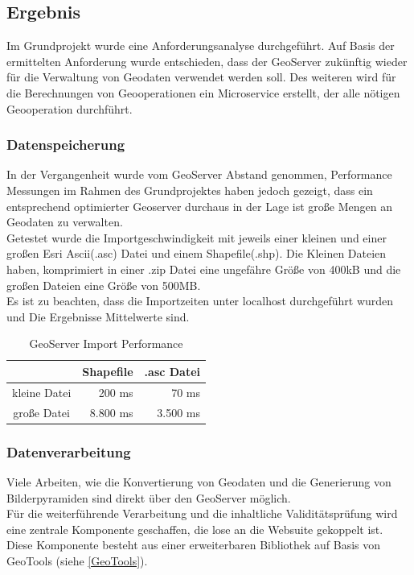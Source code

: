 \documentclass[10pt,conference,compsocconf]{IEEEtran}
\begin{document}
\subsection{Ergebnis}
Im Grundprojekt wurde eine Anforderungsanalyse durchgeführt. Auf Basis der ermittelten Anforderung wurde entschieden, dass der GeoServer zukünftig wieder für die Verwaltung von Geodaten verwendet werden soll. Des weiteren wird für die Berechnungen von Geooperationen ein Microservice erstellt, der alle nötigen Geooperation durchführt.

\subsubsection{Datenspeicherung}
In der Vergangenheit wurde vom GeoServer Abstand genommen, Performance Messungen im Rahmen des Grundprojektes haben jedoch gezeigt, dass ein entsprechend optimierter Geoserver durchaus in der Lage ist große Mengen an Geodaten zu verwalten.\\
Getestet wurde die Importgeschwindigkeit mit jeweils einer kleinen und einer großen Esri Ascii(.asc) Datei und einem Shapefile(.shp). Die Kleinen Dateien haben, komprimiert in einer .zip Datei eine ungefähre Größe von 400kB und die großen Dateien eine Größe von 500MB.\\
Es ist zu beachten, dass die Importzeiten unter localhost durchgeführt wurden und Die Ergebnisse Mittelwerte sind.\\
\begin{table}[H]
	{\tabulinesep=2mm
	\begin{center}\begin{tabu}{ |c|r|r| }
		\hline
		& \textbf{Shapefile} & \textbf{.asc Datei} \\ \hline
		kleine Datei & 200 ms & 70 ms \\ \hline
		große Datei & 8.800 ms & 3.500 ms \\ \hline
	\end{tabu}\end{center}}
	\caption{GeoServer Import Performance}
\end{table}

\subsubsection{Datenverarbeitung}
Viele Arbeiten, wie die Konvertierung von Geodaten und die Generierung von Bilderpyramiden sind direkt über den GeoServer möglich.\\
Für die weiterführende Verarbeitung und die inhaltliche Validitätsprüfung wird eine zentrale Komponente geschaffen, die lose an die Websuite gekoppelt ist. Diese Komponente besteht aus einer erweiterbaren Bibliothek auf Basis von GeoTools (siehe \ref{GeoTools}).\\
\end{document}
